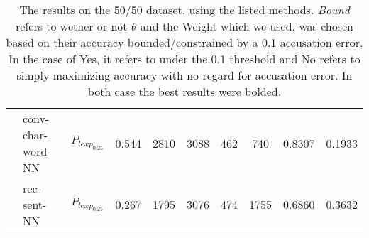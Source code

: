 \begin{table}[]
\begin{tabular}{|c|l|c|c|c|c|c|c|c|c|}
                     & \gls{conv-char-word-NN} & $P_{lexp_{0.25}}$ & 0.544    & 2810 & 3088 & 462  & 740  & 0.8307          & 0.1933          \\ \cline{2-10} 
                     & \gls{rec-sent-NN}       & $P_{lexp_{0.25}}$ & 0.267    & 1795 & 3076 & 474  & 1755 & 0.6860          & 0.3632          \\ \hline
\end{tabular}
\caption{The results on the 50/50 dataset, using the listed methods.
\textit{Bound} refers to wether or not $\theta$ and the Weight which we used,
was chosen based on their accuracy bounded/constrained by a 0.1 accusation error.
In the case of Yes, it refers to under the 0.1 threshold and No refers to simply
maximizing accuracy with no regard for accusation error. In both case
the best results were bolded.}
\label{tab:50_results}
\end{table}

